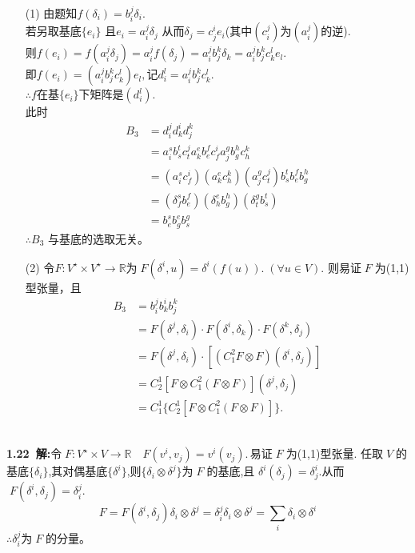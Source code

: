 \begin{itemize}
	\item [(1)] 
	由题知\;$f(\delta_i)=b_i^j\delta_i.$
	\\
	若另取基底\;$\{e_i\}$\; 且\;$e_i=a_i^j\delta_j$\; 从而\;$\delta_j=c_j^ie_i$\;(其中\;$(c_i^j)$\;为\;$(a_i^j)$\;的逆).
	\\
	则\;$f(e_i)=f(a_i^j\delta_j)=a_i^jf(\delta_j)=a_i^jb_j^k\delta_k=a_i^jb_j^kc_k^le_l$.
	\\
	即\;$f(e_i)=(a_i^jb_j^kc_k^l)e_l,$\;记\;$d_i^l=a_i^jb_j^kc_k^l.$
	\\
	$\therefore f$\;在基\;$\{e_i\}$\;下矩阵是\;$(d_i^l).$
	\\
	此时
	\begin{align*}
	B_3&=d_i^jd_k^id_j^k
	\\
	   &=a_i^s b_s^t c_t^j a_k^e b_e^f c_f^i a_j^g b_g^h c_h^k
	   \\
	   &=(a_i^s c_f^i) (a_k^e c_h^k) (a_j^g c_t^j) b_s^t b_e^f b_g^h
	   \\
	   &=(\delta_f^s b_e^f) (\delta_h^e b_g^h) (\delta_t^g b_s^t)
	   \\
	   &=b_e^s b_g^e b_s^g
	\end{align*}
	$\therefore B_3$\; 与基底的选取无关。 
	\item[(2)]
	令\;$F:V^{\star}\times V^{\star}\to \mathbb{R}$\;为$\; F(\delta^i,u)=\delta^i(f(u)).\;(\forall u\in V)$.\; 则易证$\;F\;$为\;(1,1)\;型张量，且
	\begin{align*}
	B_3&=b_i^j b_k^i b_j^k
	\\
	   &=F(\delta^j,\delta_i)\cdot F(\delta^i,\delta_k)\cdot F(\delta^k,\delta_j)
	   \\
	   &=F(\delta^j,\delta_i)\cdot [(C_1^2 F\otimes F)(\delta^i,\delta_j)]
	   \\
	   &=C_2^1[F\otimes C_1^2(F\otimes F)](\delta^j,\delta_j)
	   \\
	   &=C_1^1 \{C_2^1 [F\otimes C_1^2(F\otimes F)]\}.
	\end{align*}
\end{itemize}
\noindent
\\
{\textbf{1.22\ 解:}}\;令$\;F:V^{\star}\times V\to \mathbb{R}\quad F(v^i,v_ j)=v^i(v_j).$\,易证$\;F\;$为\;(1,1)\;型张量.\;
任取$\;V\;$的基底\;$\{\delta_i\}$,\;其对偶基底\;$\{\delta^i\}$,\;则\;$\{\delta_i\otimes \delta^j\}$\;为$\;F\;$的基底,且 \;$\delta^i(\delta_j)=\delta_j^i$.\;从而
$\; F(\delta^i,\delta_j)=\delta_i^j.$
$$F=F(\delta^i,\delta_j)\delta_i\otimes\delta^j=\delta_i^j\delta_i\otimes \delta^j=\sum_{i}\delta_i\otimes \delta^i$$
$\therefore \delta_i^j$\;为$\;F\;$的分量。
 
